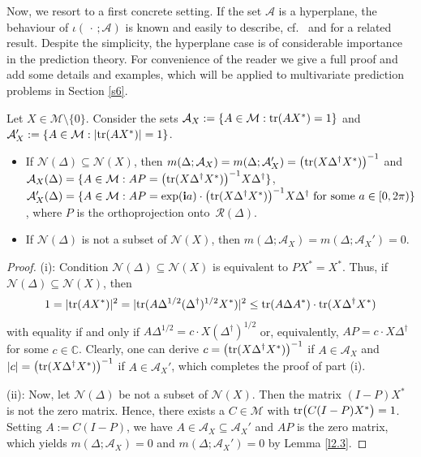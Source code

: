 \documentclass{amsart}
\begin{document}
Now, we resort to a first concrete setting. If the set $\mathcal A$ is a hyperplane, the behaviour of $\iota(\,\cdot\,;{\mathcal A})$ is known and easily to describe, cf.~\cite[Problem 7.4.12]{HJ_alt} and \cite[2.6.P4]{HJ} for a related result. Despite the simplicity, the hyperplane case is of considerable importance in the prediction theory. For convenience of the reader we give a full proof and add some details and examples, which will be applied to multivariate prediction problems in Section \ref{s6}.

\begin{pro} \label{p2.5}
    Let $X \in {\mathcal M} \setminus \{ 0 \}$. Consider the sets ${\mathcal A}_X:= \{ A\in {\mathcal M} : {\rm tr}(A X^*) = 1 \}$ and ${{\mathcal A}_X':= \{ A\in {\mathcal M} : |{\rm tr}(A X^*)| = 1 \}}$. 
\begin{itemize}
   \item[(i)]
 If ${\mathcal N}(\Delta) \subseteq {\mathcal N}(X)$, then  $m(\Delta;{\mathcal A}_X) = m(\Delta;{\mathcal A}_X') = \bigl({\rm tr}(X\Delta^{\dagger}X^*) \bigr)^{-1}$ and ${\mathcal A}_X(\Delta) = \{ A\in {\mathcal M}: AP = \bigl({\rm tr}(X\Delta^{\dagger}X^*) \bigr)^{-1}X\Delta^{\dagger}\}$,
${\mathcal A}_X'(\Delta) = \{ A\in {\mathcal M} : AP = \exp({\bf i} a) \cdot \bigl({\rm tr}(X\Delta^{\dagger}X^*) \bigr)^{-1}X\Delta^{\dagger} \mbox{ for some } a\in [0,2\pi) \}$, where $P$ is the orthoprojection onto~${\mathcal R}(\Delta)$.
   \item[(ii)]
If ${\mathcal N}(\Delta)$ is not a subset of ${\mathcal N}(X)$, then  $m(\Delta;{\mathcal A}_X) = m(\Delta;{\mathcal A}_X') = 0$.
\end{itemize}
\end{pro}

\begin{proof}
(i): Condition ${\mathcal N}(\Delta) \subseteq {\mathcal N}(X)$ is equivalent to $PX^*=X^*$. Thus, if ${\mathcal N}(\Delta) \subseteq {\mathcal N}(X)$, then
\[
    1 = |{\rm tr}(AX^*) |^2   =    |{\rm tr}(A\Delta^{1/2}(\Delta^{\dagger})^{1/2}X^*) |^2
    \leq {\rm tr}(A\Delta A^*) \cdot  {\rm tr}(X\Delta^{\dagger} X^*) 
\]
with equality if and only if $A\Delta^{1/2} = c \cdot X(\Delta^{\dagger})^{1/2}$ or, equivalently, $AP = c \cdot X\Delta^{\dagger}$ for some $c \in \mathbb C$. Clearly, one can derive $c = \bigl({\rm tr}(X\Delta^{\dagger}X^*) \bigr)^{-1}$ if $A\in {\mathcal A}_X$ and $|c| = \bigl({\rm tr}(X\Delta^{\dagger}X^*) \bigr)^{-1}$  if $A\in {\mathcal A}_X'$, which completes the proof of part (i).

(ii): Now, let ${\mathcal N}(\Delta)$ be not a subset of ${\mathcal N}(X)$. Then the matrix $(I-P)X^*$ is not the zero matrix. Hence, there exists a $C\in \mathcal M$ with ${\rm tr}\bigl(C(I-P)X^* \bigr) = 1$. Setting $A:=C(I-P)$, we have $A\in {\mathcal A}_X\subseteq {\mathcal A}_X'$ and $AP$ is the zero matrix, which yields $m(\Delta;{\mathcal A}_X) = 0$ and $m(\Delta;{\mathcal A}_X') = 0$ by Lemma \ref{l2.3}.
\end{proof}
\end{document}
